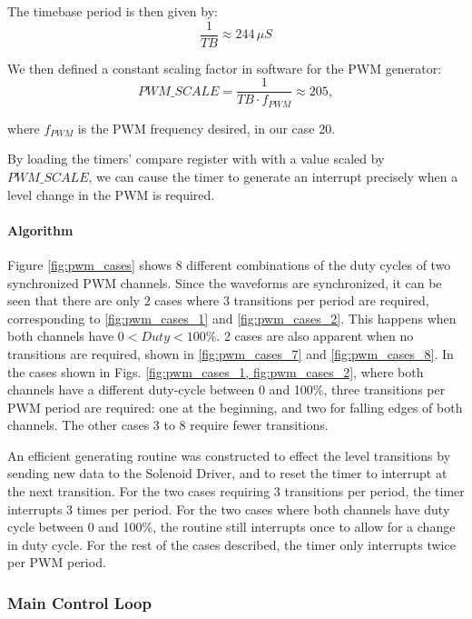 The timebase period is then given by:
\begin{equation}
\frac{1}{TB}\approx244\,\mu{S}
\end{equation}

We then defined a constant scaling factor in software for the PWM generator:
\begin{equation}
{PWM\_SCALE}=\frac{1}{TB\cdot{f_{PWM}}}\approx205,
\end{equation}

where $f_{PWM}$ is the PWM frequency desired, in our case \unit{20}{\hertz}.

By loading the timers' compare register with with a value scaled by ${PWM\_SCALE}$, we can cause the timer to generate an interrupt precisely when a level change in the PWM is required.

\paragraph{Algorithm}

Figure \ref{fig:pwm_cases} shows 8 different combinations of the duty cycles of two synchronized PWM channels. Since the waveforms are synchronized, it can be seen that there are only 2 cases where 3 transitions per period are required, corresponding to \ref{fig:pwm_cases_1} and \ref{fig:pwm_cases_2}. This happens when both channels have $0<Duty<100\%$. 2 cases are also apparent when no transitions are required, shown in \ref{fig:pwm_cases_7} and \ref{fig:pwm_cases_8}. In the cases shown in Figs. \ref{fig:pwm_cases_1, fig:pwm_cases_2}, where both channels have a different duty-cycle between 0 and 100\%, three transitions per PWM period are required: one at the beginning, and two for falling edges of both channels. The other cases 3 to 8 require fewer transitions.

An efficient generating routine was constructed to effect the level transitions by sending new data to the Solenoid Driver, and to reset the timer to interrupt at the next transition. For the two cases requiring 3 transitions per period, the timer interrupts 3 times per period. For the two cases where both channels have duty cycle between 0 and 100\%, the routine still interrupts once to allow for a change in duty cycle. For the rest of the cases described, the timer only interrupts twice per PWM period.



\subsubsection{Main Control Loop}